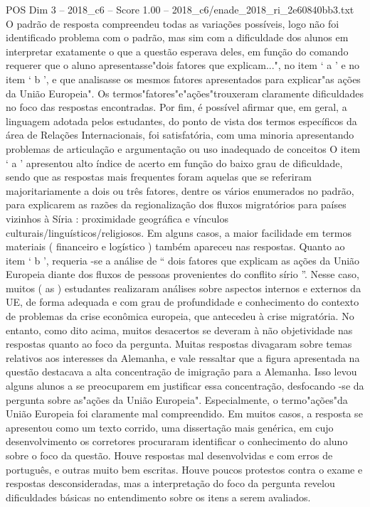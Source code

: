 \begin{textsample}{POS Dim 3 – 2018\_c6 – Score 1.00 – 2018\_c6/enade\_2018\_ri\_2e60840bb3.txt}
O padrão de resposta compreendeu todas as variações possíveis, logo não foi identificado problema com o padrão, mas sim com a dificuldade dos alunos em interpretar exatamente o que a questão esperava deles, em função do comando requerer que o aluno apresentasse"dois fatores que explicam...", no item ‘ a ’ e no item ‘ b ’, e que analisasse os mesmos fatores apresentados para explicar"as ações da União Europeia".
Os termos"fatores"e"ações"trouxeram claramente dificuldades no foco das respostas encontradas.
Por fim, é possível afirmar que, em geral, a linguagem adotada pelos estudantes, do ponto de vista dos termos específicos da área de Relações Internacionais, foi satisfatória, com uma minoria apresentando problemas de articulação e argumentação ou uso inadequado de conceitos O item ‘ a ’ apresentou alto índice de acerto em função do baixo grau de dificuldade, sendo que as respostas mais frequentes foram aquelas que se referiram majoritariamente a dois ou três fatores, dentre os vários enumerados no padrão, para explicarem as razões da regionalização dos fluxos migratórios para países vizinhos à Síria : proximidade geográfica e vínculos culturais/linguísticos/religiosos.
Em alguns casos, a maior facilidade em termos materiais ( financeiro e logístico ) também apareceu nas respostas.
Quanto ao item ‘ b ’, requeria -se a análise de “ dois fatores que explicam as ações da União Europeia diante dos fluxos de pessoas provenientes do conflito sírio ”.
Nesse caso, muitos ( as ) estudantes realizaram análises sobre aspectos internos e externos da UE, de forma adequada e com grau de profundidade e conhecimento do contexto de problemas da crise econômica europeia, que antecedeu à crise migratória.
No entanto, como dito acima, muitos desacertos se deveram à não objetividade nas respostas quanto ao foco da pergunta.
Muitas respostas divagaram sobre temas relativos aos interesses da Alemanha, e vale ressaltar que a figura apresentada na questão destacava a alta concentração de imigração para a Alemanha.
Isso levou alguns alunos a se preocuparem em justificar essa concentração, desfocando -se da pergunta sobre as"ações da União Europeia".
Especialmente, o termo"ações"da União Europeia foi claramente mal compreendido.
Em muitos casos, a resposta se apresentou como um texto corrido, uma dissertação mais genérica, em cujo desenvolvimento os corretores procuraram identificar o conhecimento do aluno sobre o foco da questão.
Houve respostas mal desenvolvidas e com erros de português, e outras muito bem escritas.
Houve poucos protestos contra o exame e respostas desconsideradas, mas a interpretação do foco da pergunta revelou dificuldades básicas no entendimento sobre os itens a serem avaliados.

\end{textsample}
